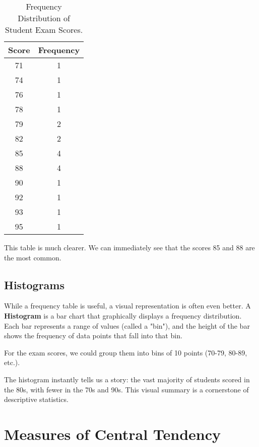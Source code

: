 \begin{table}[htbp]
\centering
\caption{Frequency Distribution of Student Exam Scores.}
\begin{tabular}{|c|c|}
\hline
\textbf{Score} & \textbf{Frequency} \\
\hline
71 & 1 \\
74 & 1 \\
76 & 1 \\
78 & 1 \\
79 & 2 \\
82 & 2 \\
85 & 4 \\
88 & 4 \\
90 & 1 \\
92 & 1 \\
93 & 1 \\
95 & 1 \\
\hline
\end{tabular}
\end{table}

This table is much clearer. We can immediately see that the scores 85 and 88 are the most common.

\subsection{Histograms}
While a frequency table is useful, a visual representation is often even better. A \textbf{Histogram} is a bar chart that graphically displays a frequency distribution. Each bar represents a range of values (called a "bin"), and the height of the bar shows the frequency of data points that fall into that bin.

For the exam scores, we could group them into bins of 10 points (70-79, 80-89, etc.).


The histogram instantly tells us a story: the vast majority of students scored in the 80s, with fewer in the 70s and 90s. This visual summary is a cornerstone of descriptive statistics.

\section{Measures of Central Tendency}


